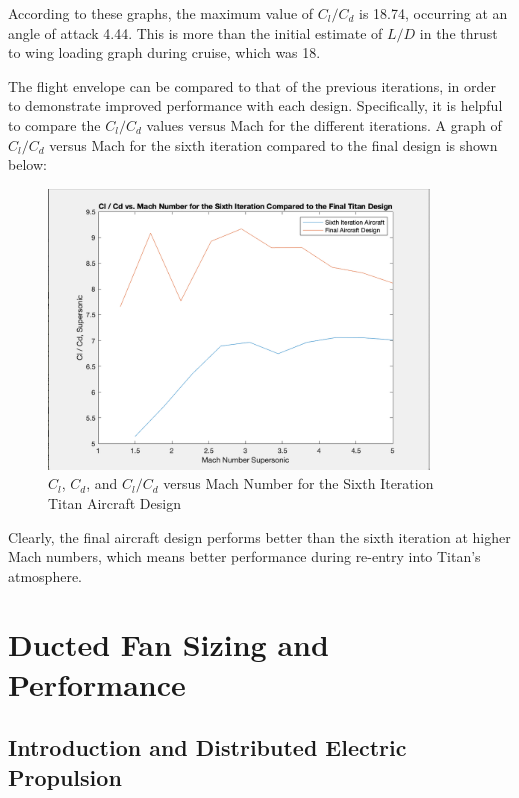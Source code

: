 \documentclass{article}
\begin{document}
According to these graphs, the maximum value of ${C_{l}}/{C_{d}}$ is 18.74, occurring at an angle of attack 4.44. This is more than the initial estimate of ${L}/{D}$ in the thrust to wing loading graph during cruise, which was 18. 


The flight envelope can be compared to that of the previous iterations, in order to demonstrate improved performance with each design. Specifically, it is helpful to compare the ${C_{l}}/{C_{d}}$ values versus Mach for the different iterations. A graph of ${C_{l}}/{C_{d}}$ versus Mach for the sixth iteration compared to the final design is shown below: 

\begin{figure}[H]
    \centering
    \includegraphics[width = 0.90\textwidth]{Figures/v11+v13Super.png}
    \caption{${C_{l}}$, ${C_{d}}$, and ${C_{l}}/{C_{d}}$ versus Mach Number for the Sixth Iteration Titan Aircraft Design}
    \label{fig:v11+v13Super}
\end{figure}

Clearly, the final aircraft design performs better than the sixth iteration at higher Mach numbers, which means better performance during re-entry into Titan's atmosphere. 



\section{Ducted Fan Sizing and Performance}
\label{sec:Ducted Fan Sizing and Performance}

\subsection{Introduction and Distributed Electric Propulsion}
\label{sec:Introduction and Distributed Electric Propulsion}
\end{document}
